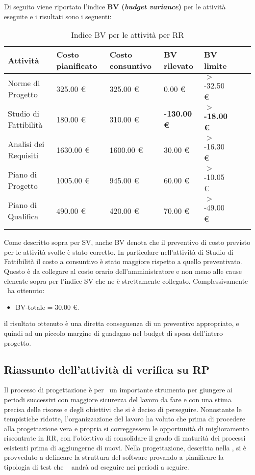 Di seguito viene riportato l'indice \textbf{BV (\textit{budget variance})} per le attività eseguite e i risultati sono i seguenti:
\begin{longtable}{lllllXr}
\toprule
\textbf{Attività} & \textbf{Costo pianificato} & \textbf{Costo consuntivo} & \textbf{BV rilevato} & \textbf{BV limite} \\
\toprule
Norme di Progetto & 325.00 € & 325.00 € & 0.00 € & $>$ -32.50 €\\
\midrule
Studio di Fattibilità & 180.00 € & 310.00 € & \textbf{-130.00 €} & \textbf{$>$ -18.00 €}\\
\midrule
Analisi dei Requisiti & 1630.00 € & 1600.00 € & 30.00 € & $>$ -16.30 €\\
\midrule
Piano di Progetto & 1005.00 € & 945.00 € & 60.00 € & $>$ -10.05 €\\
\midrule
Piano di Qualifica & 490.00 € & 420.00 € & 70.00 € & $>$ -49.00 €\\
\bottomrule
\caption{Indice BV per le attività per RR}
\end{longtable}
Come descritto sopra per SV, anche BV denota che il preventivo di costo previsto per le attività svolte è stato corretto.
In particolare nell'attività di Studio di Fattibilità il costo a consuntivo è stato maggiore rispetto a quello preventivato. Questo è da collegare al costo orario dell'amministratore e non meno alle cause elencate sopra per l'indice SV che ne è strettamente collegato.
Complessivamente \gruppo ~ha ottenuto:
\begin{itemize}
\item BV-totale = 30.00 €.
\end{itemize}
il risultato ottenuto è una diretta conseguenza di un preventivo appropriato, e quindi ad un piccolo margine di guadagno nel budget di spesa dell'intero progetto.
\subsection{Riassunto dell'attività di verifica su RP}
Il processo di progettazione è per \gruppo ~un importante strumento per giungere ai periodi successivi con maggiore sicurezza del lavoro da fare e con una stima precisa delle risorse e degli obiettivi che si è deciso di perseguire. Nonostante le tempistiche ridotte, l'organizzazione del lavoro ha voluto che prima di procedere alla progettazione vera e propria si correggessero le opportunità di miglioramento riscontrate in RR, con l'obiettivo di consolidare il grado di maturità dei processi esistenti prima di aggiungerne di nuovi. Nella progettazione, descritta nella \infoST, si è provveduto a delineare la struttura del software provando a pianificare la tipologia di test che \gruppo~ andrà ad eseguire nei periodi a seguire. 
